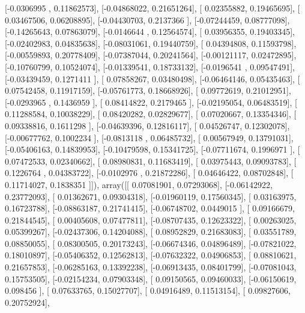 \documentclass{article}
\begin{document}
       [-0.0306995 ,  0.11862573],
       [-0.04868022,  0.21651264],
       [ 0.02355882,  0.19465695],
       [ 0.03467506,  0.06208895],
       [-0.04430703,  0.2137366 ],
       [-0.07244459,  0.08777098],
       [-0.14265643,  0.07863079],
       [-0.0146644 ,  0.12564574],
       [ 0.03956355,  0.19403345],
       [-0.02402983,  0.04835638],
       [-0.08031061,  0.19440759],
       [ 0.04394808,  0.11593798],
       [-0.00559893,  0.20778409],
       [-0.07387044,  0.20241564],
       [-0.00121117,  0.02472895],
       [-0.10760799,  0.10524074],
       [-0.01339541,  0.18733132],
       [-0.0196541 ,  0.09547491],
       [-0.03439459,  0.1271411 ],
       [ 0.07858267,  0.03480498],
       [-0.06464146,  0.05435463],
       [ 0.07542458,  0.11917159],
       [-0.05761773,  0.18668926],
       [ 0.09772619,  0.21012951],
       [-0.0293965 ,  0.1436959 ],
       [ 0.08414822,  0.2179465 ],
       [-0.02195054,  0.06483519],
       [ 0.11288584,  0.10038229],
       [ 0.08420282,  0.02829677],
       [ 0.07020667,  0.13354346],
       [ 0.09338816,  0.1611298 ],
       [-0.04639396,  0.12816117],
       [ 0.04526747,  0.12302078],
       [-0.00677762,  0.1002234 ],
       [-0.0813118 ,  0.06485732],
       [ 0.00567949,  0.13791031],
       [-0.05406163,  0.14839953],
       [-0.10479598,  0.15341725],
       [-0.07711674,  0.1996971 ],
       [ 0.07472533,  0.02340662],
       [ 0.08980831,  0.11683419],
       [ 0.03975443,  0.09093783],
       [ 0.1226764 ,  0.04383722],
       [-0.0102976 ,  0.21872286],
       [ 0.04646422,  0.08702848],
       [ 0.11714027,  0.1838351 ]]), array([[ 0.07081901,  0.07293068],
       [-0.06142922,  0.23772093],
       [ 0.01362671,  0.09304318],
       [-0.01960119,  0.17560345],
       [ 0.03163975,  0.16723788],
       [-0.08863187,  0.21741415],
       [-0.06748702,  0.0449015 ],
       [ 0.09166679,  0.21844545],
       [ 0.00405608,  0.07477811],
       [-0.08707435,  0.12623322],
       [ 0.00263025,  0.05399267],
       [-0.02437306,  0.14204088],
       [ 0.08952829,  0.21683083],
       [ 0.03551789,  0.08850055],
       [ 0.08300505,  0.20173243],
       [-0.06674346,  0.04896489],
       [-0.07821022,  0.18010897],
       [-0.05406352,  0.12562813],
       [-0.07632322,  0.04906853],
       [ 0.08810621,  0.21657853],
       [-0.06285163,  0.13392238],
       [-0.06913435,  0.08401799],
       [-0.07081043,  0.15753505],
       [-0.02154234,  0.07903348],
       [ 0.09150565,  0.09460033],
       [-0.06150619,  0.098456  ],
       [ 0.07633765,  0.15027707],
       [ 0.04916489,  0.11513154],
       [ 0.09827606,  0.20752924],
\end{document}
